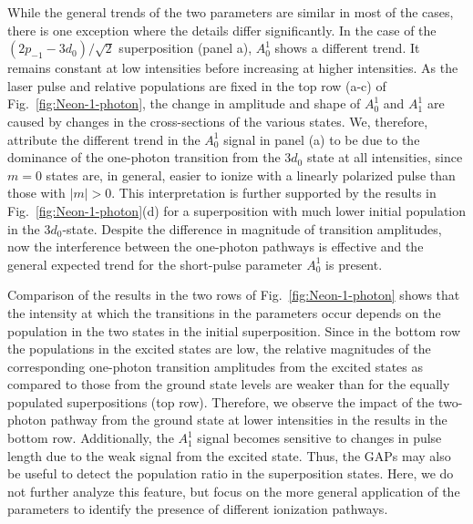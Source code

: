 While the general trends of the two parameters are similar in most of the cases, there is one exception where the details differ significantly. In the case of the $(2p_{-1}-3d_0)/\sqrt{2}$ superposition (panel a), $A_0^1$ shows a different trend. It remains constant at low intensities before increasing at higher intensities. As the laser pulse and relative populations are fixed in the top row (a-c) of Fig.~\ref{fig:Neon-1-photon}, the change in amplitude and shape of $A_0^1$ and $A_1^1$ are caused by changes in the cross-sections of the various states. We, therefore, attribute the different trend in the $A_0^1$ signal in panel (a) to be due to the dominance of the one-photon transition from the $3d_0$ state at all intensities, since $m=0$ states are, in general, easier to ionize with a linearly polarized pulse than those with $|m| > 0$. This interpretation is further supported by the results in Fig.~\ref{fig:Neon-1-photon}(d) for a superposition with much lower initial population in the $3d_0$-state. Despite the difference in magnitude of transition amplitudes, now the interference between the one-photon pathways is effective and the general expected trend for the short-pulse parameter $A_0^1$ is present.

Comparison of the results in the two rows of Fig.~\ref{fig:Neon-1-photon} shows that the intensity at which the transitions in the parameters occur depends on the population in the two states in the initial superposition.
Since in the bottom row the populations in the excited states are low, the relative magnitudes of the corresponding one-photon transition amplitudes from the excited states as compared to those from the ground state levels are weaker than for the equally populated superpositions (top row). Therefore, we observe the impact of the two-photon pathway from the ground state at lower intensities in the results in the bottom row. Additionally, the $A_1^1$ signal becomes sensitive to changes in pulse length due to the weak signal from the excited state. Thus, the GAPs may also be useful to detect the population ratio in the superposition states. Here, we do not further analyze this feature, but focus on the more general application of the parameters to identify the presence of different ionization pathways.


